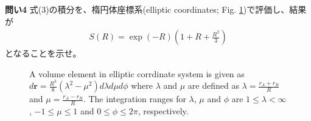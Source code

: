 \documentclass[11pt,pra,aps]{revtex4}
\begin{document}
\noindent
{\bf 問い4} 式(3)の積分を、楕円体座標系(elliptic coordinates; Fig. \ref{fig:elliptic})で評価し、結果が
\begin{align}
  S(R)=\exp(-R)\left(1+R+\frac{R^2}{3}\right)
\end{align}
となることを示せ。
{
  \begin{figure}[H]
    \begin{center}
    \caption{\label{fig:elliptic}
      {
        A volume element in elliptic corrdinate system is given as $d\mathbf{r}=\frac{R^3}{8}(\lambda^2-\mu^2)d\lambda d\mu d\phi$ where $\lambda$ and $\mu$ are defined as $\lambda=\frac{r_A+r_B}{R}$ and $\mu=\frac{r_A-r_B}{R}$. The integration ranges for $\lambda$, $\mu$ and $\phi$ are $1\leq \lambda<\infty$, $-1\leq\mu\leq 1$ and $0\leq\phi\leq 2\pi$, respectively.
      }
    }
    \end{center}
  \end{figure}
}
\end{document}
